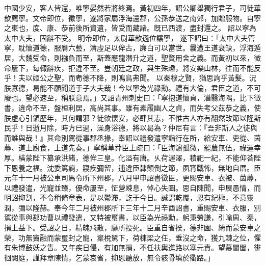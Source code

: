 \begin{pinyinscope}
中國少安，客人皆還，唯寧晏然若將終焉。黃初四年，詔公卿舉獨行君子，司徒華歆薦寧。文帝即位，徵寧，遂將家屬浮海還郡，公孫恭送之南郊，加贈服物。自寧之東也，度、康、恭前後所資遺，皆受而藏諸。旣已西渡，盡封還之。
詔以寧為太中大夫，固辭不受。
明帝即位，太尉華歆遜位讓寧，
遂下詔曰：「太中大夫管寧，耽懷道德，服膺六藝，清虛足以侔古，廉白可以當世。曩遭王道衰缺，浮海遁居，大魏受命，則襁負而至，斯蓋應龍潛升之道，聖賢用舍之義。而黃初以來，徵命屢下，每輙辭疾，拒違不至。豈朝廷之政，與生殊趣，將安樂山林，往而不能反乎！夫以姬公之聖，而耇德不降，則鳴鳥弗聞。
以秦穆之賢，猶思詢乎黃髮。況朕寡德，曷能不願聞道于子大夫哉！今以寧為光祿勳。禮有大倫，君臣之道，不可廢也。望必速至，稱朕意焉。」又詔青州刺史曰：「寧抱道懷貞，潛翳海隅，比下徵書，違命不至，盤桓利居，高尚其事。雖有素履幽人之貞，而失考父茲恭之義，使朕虛心引領歷年，其何謂邪？徒欲懷安，必肆其志，不惟古人亦有翻然改節以隆斯民乎！日逝月除，時方已過，澡身浴德，將以曷為？仲尼有言：『吾非斯人之徒與而誰與哉！』其命別駕從事郡丞掾，奉詔以禮發遣寧詣行在所，給安車、吏從、茵蓐、道上廚食，上道先奏。」寧稱草莽臣上疏曰：「臣海濵孤微，罷農無伍，祿運幸厚。橫蒙陛下纂承洪緒，德侔三皇。化溢有唐。乆荷渥澤，積祀一紀，不能仰荅陛下恩養之福。沈委篤痾，寢疾彌留，逋違臣隷顛倒之節，夙宵戰怖，無地自厝。臣元年十一月被公車司馬令所下州郡，八月甲申詔書徵臣，更賜安車、衣被、茵蓐，以禮發遣，光寵並臻，優命屢至，怔營竦息，悼心失圖。思自陳聞，申展愚情，而明詔抑割，不令稍脩章表，是以鬱滯，訖于今日。誠謂乾覆，恩有紀極，不意靈潤，彌以隆赫。奉今年二月被州郡所下三年十二月辛酉詔書，重賜安車、衣服，別駕從事與郡功曹以禮發遣，又特被璽書，以臣為光祿勳，躬秉勞謙，引喻周、秦，損上益下。受詔之日，精魄飛散，靡所投死。臣重自省揆，德非園、綺而蒙安車之榮，功無竇融而蒙璽封之寵，楶梲駑下，荷棟梁之任，垂沒之命，獲九棘之位，懼有朱博鼓妖之眚。又年疾日侵，有加無損，不任扶輿進路以塞元責。望慕閶闔，徘徊闕庭，謹拜章陳情，乞蒙哀省，抑恩聽放，無令骸骨填於衢路。」



\end{pinyinscope}
